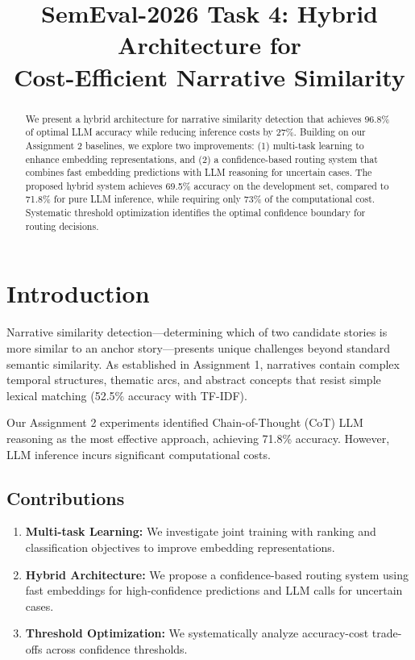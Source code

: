 \documentclass[conference]{IEEEtran}
\title{SemEval-2026 Task 4: Hybrid Architecture for\\Cost-Efficient Narrative Similarity}
\author{
\IEEEauthorblockN{Muhammad Musaab-Ul-Haq (501739), Ahmed Hassan Raza (511263),\\Abdul Mueed (501166), Usman Amjad (516261)}
\IEEEauthorblockA{CS-272: Artificial Intelligence\\
National University of Sciences and Technology (NUST)}
}
\begin{document}
\maketitle

\begin{abstract}
We present a hybrid architecture for narrative similarity detection that achieves 96.8\% of optimal LLM accuracy while reducing inference costs by 27\%. Building on our Assignment 2 baselines, we explore two improvements: (1) multi-task learning to enhance embedding representations, and (2) a confidence-based routing system that combines fast embedding predictions with LLM reasoning for uncertain cases. The proposed hybrid system achieves 69.5\% accuracy on the development set, compared to 71.8\% for pure LLM inference, while requiring only 73\% of the computational cost. Systematic threshold optimization identifies the optimal confidence boundary for routing decisions.
\end{abstract}

\section{Introduction}

Narrative similarity detection---determining which of two candidate stories is more similar to an anchor story---presents unique challenges beyond standard semantic similarity. As established in Assignment 1, narratives contain complex temporal structures, thematic arcs, and abstract concepts that resist simple lexical matching (52.5\% accuracy with TF-IDF).

Our Assignment 2 experiments identified Chain-of-Thought (CoT) LLM reasoning as the most effective approach, achieving 71.8\% accuracy. However, LLM inference incurs significant computational costs.

\subsection{Contributions}
\begin{enumerate}
    \item \textbf{Multi-task Learning:} We investigate joint training with ranking and classification objectives to improve embedding representations.
    \item \textbf{Hybrid Architecture:} We propose a confidence-based routing system using fast embeddings for high-confidence predictions and LLM calls for uncertain cases.
    \item \textbf{Threshold Optimization:} We systematically analyze accuracy-cost trade-offs across confidence thresholds.
\end{enumerate}
\end{document}
